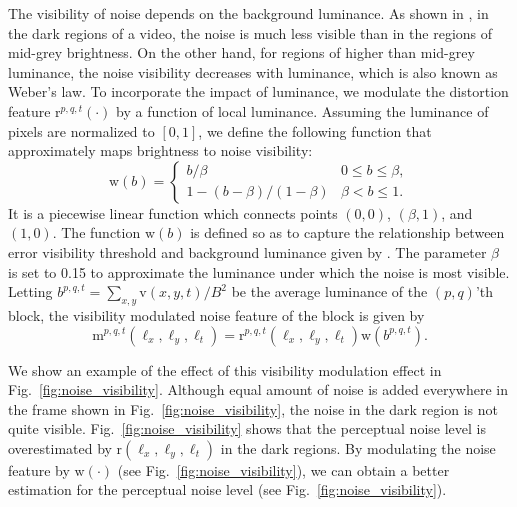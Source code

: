 \documentclass{sig-alternate}
\begin{document}
The visibility of noise depends on the background luminance. As shown in \cite{ChoLi1995,Gir1989}, in the dark regions of a video, the noise is much less visible than in the regions of mid-grey brightness. On the other hand, for regions of higher than mid-grey luminance, the noise visibility decreases with luminance, which is also known as Weber's law. To incorporate the impact of luminance, we modulate the distortion feature $\mathrm{r}^{p,q,t}(\cdot)$ by a function of local luminance. Assuming the luminance of pixels are normalized to $[0,1]$, we define the following function that approximately maps brightness to noise visibility: 
\begin{equation}
\label{eq:brightness}
\mathrm{w}(b) = \begin{cases}
b/\beta & 0\leq b\leq\beta,\\
1-(b-\beta)/(1-\beta) & \beta<b\leq1.
\end{cases}
\end{equation}
It is a piecewise linear function which connects points $(0,0)$, $(\beta,1)$, and $(1,0)$. The function $\mathrm{w}(b)$ is defined so as to capture the relationship between error visibility threshold and background luminance given by \cite{ChoLi1995}. The parameter $\beta$ is set to 0.15 to approximate the luminance under which the noise is most visible. Letting $b^{p,q,t}=\sum_{x,y}{\mathrm{v}(x,y,t)}/B^2$ be the average luminance of the $(p,q)$'th block, the visibility modulated noise feature of the block is given by
\begin{equation}
\label{eq:brightness_feature}
\mathrm{m}^{p,q,t}(\ell_x,\ell_y,\ell_t) = \mathrm{r}^{p,q,t}\left(\ell_x,\ell_y,\ell_t\right)\mathrm{w}\left(b^{p,q,t}\right).
\end{equation}

We show an example of the effect of this visibility modulation effect in Fig.~\ref{fig:noise_visibility}. Although equal amount of noise is added everywhere in the frame shown in Fig.~\ref{fig:noise_visibility}, the noise in the dark region is not quite visible. Fig.~\ref{fig:noise_visibility} shows that the perceptual noise level is overestimated by $\mathrm{r}(\ell_x,\ell_y,\ell_t)$ in the dark regions. By modulating the noise feature by $\mathrm{w}(\cdot)$ (see Fig.~\ref{fig:noise_visibility}), we can obtain a better estimation for the perceptual noise level (see Fig.~\ref{fig:noise_visibility}).
\end{document}
